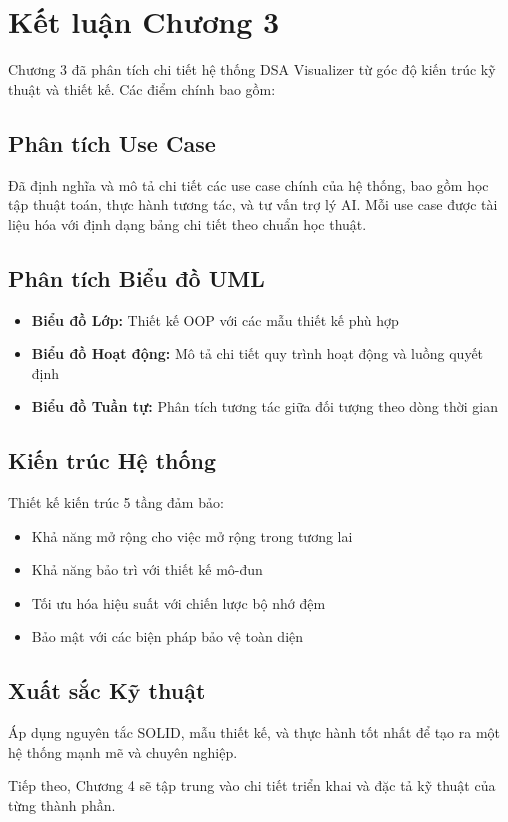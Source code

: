 \section{Kết luận Chương 3}
\label{sec:chapter3-conclusion}

Chương 3 đã phân tích chi tiết hệ thống DSA Visualizer từ góc độ kiến trúc kỹ thuật và thiết kế. Các điểm chính bao gồm:

\subsection{Phân tích Use Case}
Đã định nghĩa và mô tả chi tiết các use case chính của hệ thống, bao gồm học tập thuật toán, thực hành tương tác, và tư vấn trợ lý AI. Mỗi use case được tài liệu hóa với định dạng bảng chi tiết theo chuẩn học thuật.

\subsection{Phân tích Biểu đồ UML}
\begin{itemize}
    \item \textbf{Biểu đồ Lớp:} Thiết kế OOP với các mẫu thiết kế phù hợp
    \item \textbf{Biểu đồ Hoạt động:} Mô tả chi tiết quy trình hoạt động và luồng quyết định
    \item \textbf{Biểu đồ Tuần tự:} Phân tích tương tác giữa đối tượng theo dòng thời gian
\end{itemize}

\subsection{Kiến trúc Hệ thống}
Thiết kế kiến trúc 5 tầng đảm bảo:
\begin{itemize}
    \item Khả năng mở rộng cho việc mở rộng trong tương lai
    \item Khả năng bảo trì với thiết kế mô-đun
    \item Tối ưu hóa hiệu suất với chiến lược bộ nhớ đệm
    \item Bảo mật với các biện pháp bảo vệ toàn diện
\end{itemize}

\subsection{Xuất sắc Kỹ thuật}
Áp dụng nguyên tắc SOLID, mẫu thiết kế, và thực hành tốt nhất để tạo ra một hệ thống mạnh mẽ và chuyên nghiệp.

Tiếp theo, Chương 4 sẽ tập trung vào chi tiết triển khai và đặc tả kỹ thuật của từng thành phần.
